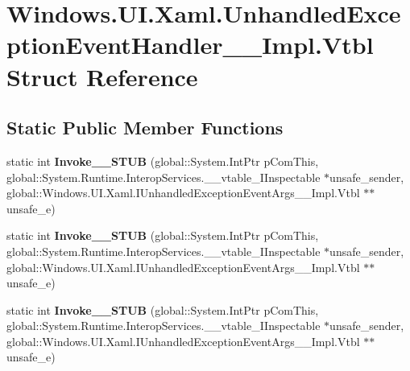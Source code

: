 \hypertarget{struct_windows_1_1_u_i_1_1_xaml_1_1_unhandled_exception_event_handler_____impl_1_1_vtbl}{}\section{Windows.\+U\+I.\+Xaml.\+Unhandled\+Exception\+Event\+Handler\+\_\+\+\_\+\+Impl.\+Vtbl Struct Reference}
\label{struct_windows_1_1_u_i_1_1_xaml_1_1_unhandled_exception_event_handler_____impl_1_1_vtbl}
\subsection*{Static Public Member Functions}
\begin{DoxyCompactItemize}
\item 
\mbox{\label{struct_windows_1_1_u_i_1_1_xaml_1_1_unhandled_exception_event_handler_____impl_1_1_vtbl_ace7e64c97c5f29ecca30b5d1791ecdb5}} 
static int {\bfseries Invoke\+\_\+\+\_\+\+S\+T\+UB} (global\+::\+System.\+Int\+Ptr p\+Com\+This, global\+::\+System.\+Runtime.\+Interop\+Services.\+\_\+\+\_\+vtable\+\_\+\+I\+Inspectable $\ast$unsafe\+\_\+sender, global\+::\+Windows.\+U\+I.\+Xaml.\+I\+Unhandled\+Exception\+Event\+Args\+\_\+\+\_\+\+Impl.\+Vtbl $\ast$$\ast$unsafe\+\_\+e)
\item 
\mbox{\label{struct_windows_1_1_u_i_1_1_xaml_1_1_unhandled_exception_event_handler_____impl_1_1_vtbl_ace7e64c97c5f29ecca30b5d1791ecdb5}} 
static int {\bfseries Invoke\+\_\+\+\_\+\+S\+T\+UB} (global\+::\+System.\+Int\+Ptr p\+Com\+This, global\+::\+System.\+Runtime.\+Interop\+Services.\+\_\+\+\_\+vtable\+\_\+\+I\+Inspectable $\ast$unsafe\+\_\+sender, global\+::\+Windows.\+U\+I.\+Xaml.\+I\+Unhandled\+Exception\+Event\+Args\+\_\+\+\_\+\+Impl.\+Vtbl $\ast$$\ast$unsafe\+\_\+e)
\item 
\mbox{\label{struct_windows_1_1_u_i_1_1_xaml_1_1_unhandled_exception_event_handler_____impl_1_1_vtbl_ace7e64c97c5f29ecca30b5d1791ecdb5}} 
static int {\bfseries Invoke\+\_\+\+\_\+\+S\+T\+UB} (global\+::\+System.\+Int\+Ptr p\+Com\+This, global\+::\+System.\+Runtime.\+Interop\+Services.\+\_\+\+\_\+vtable\+\_\+\+I\+Inspectable $\ast$unsafe\+\_\+sender, global\+::\+Windows.\+U\+I.\+Xaml.\+I\+Unhandled\+Exception\+Event\+Args\+\_\+\+\_\+\+Impl.\+Vtbl $\ast$$\ast$unsafe\+\_\+e)
$$
\end{DoxyCompactItemize}
